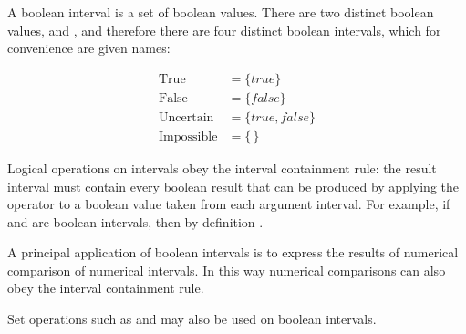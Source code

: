 A boolean interval is a set of boolean values.
There are two distinct boolean values,  and ,
and therefore there are four distinct boolean intervals,
which for convenience are given names:
\begin{center}
\begin{align*}
\mathrm{True}       &= \{\mathit{true}\} \\
\mathrm{False}      &= \{\mathit{false}\} \\
\mathrm{Uncertain}  &= \{\mathit{true,false}\} \\
\mathrm{Impossible} &= \{\,\}
\end{align*}
\end{center}
Logical operations on intervals obey the interval containment rule:
the result interval must contain every boolean result that can be produced
by applying the operator to a boolean value taken from each argument interval.
For example, if  and  are boolean intervals, then
by definition .

A principal application of boolean intervals is to express the results of
numerical comparison of numerical intervals.  In this way numerical comparisons
can also obey the interval containment rule.

Set operations such as \EXP{\cup} and \EXP{\cap} may also be used on boolean intervals.


\newpage

